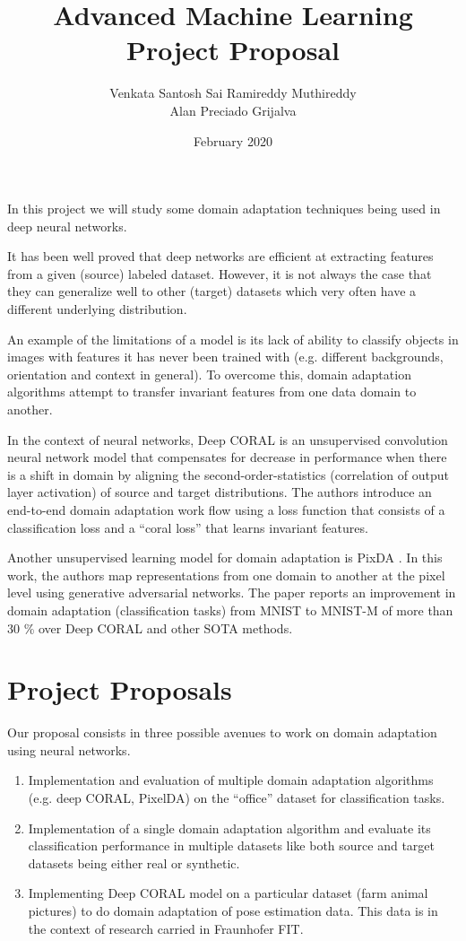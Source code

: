 \documentclass[12pt]{extarticle}
\title{Advanced Machine Learning \\ Project Proposal}
\author{Venkata Santosh Sai Ramireddy Muthireddy \\ \newline Alan Preciado Grijalva}
\date{February 2020}
\begin{document}
\maketitle

In this project we will study some domain adaptation techniques being used in deep neural networks. 

It has been well proved that deep networks are efficient at extracting features from a given (source) labeled dataset. However, it is not always the case that they can generalize well to other (target) datasets which very often have a different underlying distribution.

An example of the limitations of a model is its lack of ability to classify objects in images with features it has never been trained with (e.g. different backgrounds, orientation and context in general). To overcome this, domain adaptation algorithms attempt to transfer invariant features from one data domain to another. 

In the context of neural networks, Deep CORAL \cite{sun2016deep} is an unsupervised convolution neural network  model that compensates for decrease in performance when there is a shift in domain by aligning the second-order-statistics (correlation of output layer activation) of source and target distributions. The authors introduce an end-to-end domain adaptation work flow using a loss function that consists of a classification loss and a “coral loss” that learns invariant features.

Another unsupervised learning model for domain adaptation is PixDA \cite{bousmalis2017unsupervised}. In this work, the authors map representations from one domain to another at the pixel level using generative adversarial networks. The paper reports an improvement in domain adaptation (classification tasks) from MNIST to MNIST-M of more than 30 \% over Deep CORAL and other SOTA methods.

\section{Project Proposals}
Our proposal consists in three possible avenues to work on domain adaptation using neural networks. 
\begin{enumerate}

\item Implementation and evaluation of multiple domain adaptation algorithms (e.g. deep CORAL, PixelDA) on the “office” dataset for classification tasks. 
    \item Implementation of a single domain adaptation algorithm and evaluate its classification performance in multiple datasets like both source and target datasets being either real or synthetic.
    \item Implementing Deep CORAL model on a particular dataset (farm animal pictures) to do domain adaptation of pose estimation data. This data is in the context of research carried in Fraunhofer FIT.
\end{enumerate}


\end{document}
